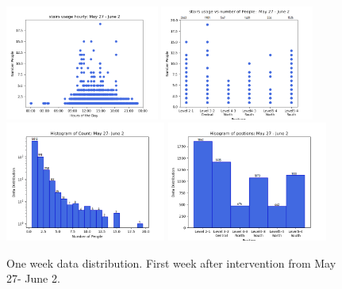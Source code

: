 \begin{figure}[!h]
    \centering
      \includegraphics[width=0.45\textwidth]{image/Chapters/Chapter6/oneWeekAfterhourly.png}%
    \includegraphics[width=0.45\textwidth]{image/Chapters/Chapter6/PositionCountOneWeekAfter.png}\hfill
    \includegraphics[width=0.47\textwidth]{image/Chapters/Chapter6/oneweekCountDistributonAfter.png}%
    \includegraphics[width=0.47\textwidth]{image/Chapters/Chapter6/oneweekafterPositionDistributon.png}
    \caption{One week data distribution. First week after intervention from May 27- June 2.}
    \label{distafter}
\end{figure}

